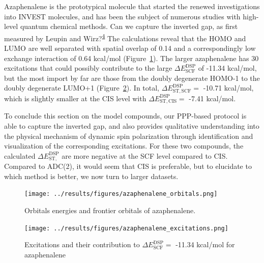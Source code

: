 \documentclass[
  number,
  3p]{elsarticle}
\newcommand{\DeltaE}[2][]{\Delta E^{\mathrm{#1}}_{\mathrm{#2}}}
\newcommand{\DeltaEST}[2][]{\Delta E^{\mathrm{#1}}_{\mathrm{ST,#2}}}
\begin{document}
Azaphenalene is the prototypical molecule that started the renewed
investigations into INVEST molecules, and has been the subject of
numerous studies with high-level quantum chemical methods. Can we
capture the inverted gap, as first measured by Leupin and
Wirz?\textsuperscript{\protect\hyperlink{ref-leupinLowlyingElectronicallyExcited1980}{4}}
The calculations reveal that the HOMO and LUMO are well separated with
spatial overlap of 0.14 and a correspondingly low exchange interaction
of 0.64 kcal/mol (Figure~\ref{fig-azaphenalene-orbitals}). The larger
azaphenalene has 30 excitations that could possibly contribute to the
large \(\DeltaE[DSP]{SCF}\) of -11.34 kcal/mol, but the most import by
far are those from the doubly degenerate HOMO-1 to the doubly degenerate
LUMO+1 (Figure~\ref{fig-azaphenalene-excitations}). In total,
\(\DeltaEST[DSP]{SCF}=\) -10.71 kcal/mol, which is slightly smaller at
the CIS level with \(\DeltaEST[DSP]{CIS}=\) -7.41 kcal/mol.

To conclude this section on the model compounds, our PPP-based protocol
is able to capture the inverted gap, and also provides qualitative
understanding into the physical mechanism of dynamic spin polarization
through identification and visualization of the corresponding
excitations. For these two compounds, the calculated
\(\DeltaEST[DSP]{}\) are more negative at the SCF level compared to CIS.
Compared to ADC(2), it would seem that CIS is preferable, but to
elucidate to which method is better, we now turn to larger datasets.

\begin{figure}

{\centering \texttt{[image: ../results/figures/azaphenalene\_orbitals.png]}

}

\caption{\label{fig-azaphenalene-orbitals}Orbitals energies and frontier
orbitals of azaphenalene.}

\end{figure}

\begin{figure}

{\centering \texttt{[image: ../results/figures/azaphenalene\_excitations.png]}

}

\caption{\label{fig-azaphenalene-excitations}Excitations and their
contribution to \(\DeltaE[DSP]{SCF}=\) -11.34 kcal/mol for azaphenalene}

\end{figure}
\end{document}
